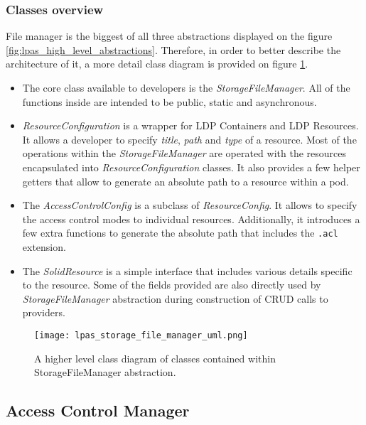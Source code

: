 \subsubsection{Classes overview}

File manager is the biggest of all three abstractions displayed on the figure \ref{fig:lpas_high_level_abstractions}. Therefore, in order to better describe the architecture of it, a more detail class diagram is provided on figure \ref{fig:lps_file_manager_class_uml}.

\begin{itemize}
	\item The core class available to \lpa{} developers is the \textit{StorageFileManager}. All of the functions inside are intended to be public, static and asynchronous. 
	\item \textit{ResourceConfiguration} is a wrapper for LDP Containers and LDP Resources. It allows a developer to specify \textit{title}, \textit{path} and \textit{type} of a resource. Most of the operations within the \textit{StorageFileManager} are operated with the resources encapsulated into \textit{ResourceConfiguration} classes. It also provides a few helper getters that allow to generate an absolute path to a resource within a pod. 
	\item The \textit{AccessControlConfig} is a subclass of \textit{ResourceConfig}. It allows to specify the access control modes to individual resources. Additionally, it introduces a few extra functions to generate the absolute path that includes the \texttt{.acl} extension.   
	\item The \textit{SolidResource} is a simple interface that includes various details specific to the resource. Some of the fields provided are also directly used by \textit{StorageFileManager} abstraction during construction of CRUD calls to \solid{} providers.
\end{itemize}


\begin{figure}[h]
\centering
\texttt{[image: lpas\_storage\_file\_manager\_uml.png]}
\caption{A higher level class diagram of classes contained within StorageFileManager abstraction.}
\label{fig:lps_file_manager_class_uml}
\end{figure}


\subsection{Access Control Manager}

